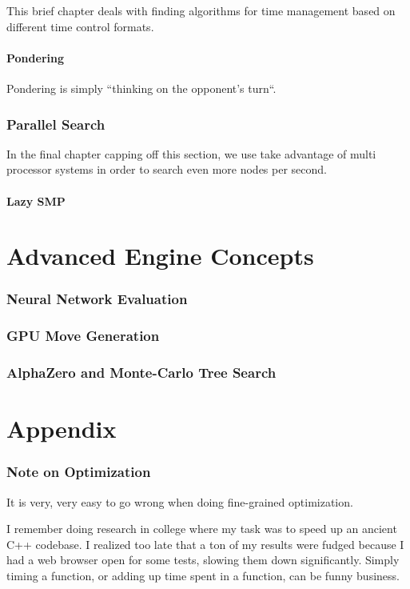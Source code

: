 \documentclass[letterpaper,11pt]{article}
\begin{document}
This brief chapter deals with finding algorithms for time management based on different time control formats.

\subsection{Pondering}

Pondering is simply ``thinking on the opponent's turn``.

\section{Parallel Search}

In the final chapter capping off this section, we use take advantage of multi processor systems in order to 
search even more nodes per second.

\subsection{Lazy SMP}

\newpage
\part{Advanced Engine Concepts}

\section{Neural Network Evaluation}

\section{GPU Move Generation}

\section{AlphaZero and Monte-Carlo Tree Search}

\newpage
\part{Appendix}
\section{Note on Optimization}

It is very, very easy to go wrong when doing fine-grained optimization.

I remember doing research in college where my task was to speed up an ancient C++ codebase. I realized too late that a ton of my results were fudged because I had a web browser open for some tests, slowing them down significantly. Simply timing a function, or adding up time spent in a function, can be funny business.
\end{document}
